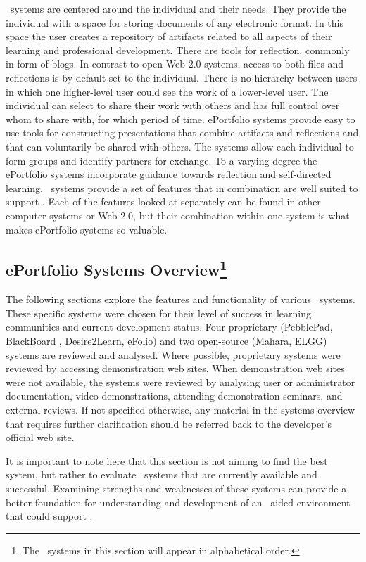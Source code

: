 \ep~systems are centered around the individual and their needs. They provide the
individual with a space for storing documents of any electronic format. In this
space the user creates a repository of artifacts related to all aspects of their
learning and professional development. There are tools for reflection, commonly
in form of blogs. In contrast to open Web 2.0 systems, access to both files and
reflections is by default set to the individual. There is no hierarchy between
users in which one higher-level user could see the work of a lower-level user.
The individual can select to share their work with others and has full control
over whom to share with, for which period of time. ePortfolio systems provide
easy to use tools for constructing presentations that combine artifacts and
reflections and that can voluntarily be shared with others. The systems allow
each individual to form groups and identify partners for exchange. To a varying
degree the ePortfolio systems incorporate guidance towards reflection and
self-directed learning. \ep~systems provide a set of features that in
combination are well suited to support \LLLsn. Each of the features looked at
separately can be found in other computer systems or Web 2.0, but their
combination within one system is what makes ePortfolio systems so valuable.

\subsection[ePortfolio Systems Overview]{ePortfolio Systems
Overview\footnote{The \ep~systems in this section will appear in alphabetical
order.}} 
The following sections explore the features and functionality of various
\ep~systems. These specific systems were chosen for their level of success in
learning communities and current development status. Four proprietary
(PebblePad, BlackBoard \ep, Desire2Learn, eFolio) and two open-source (Mahara,
ELGG) systems are reviewed and analysed. Where possible, proprietary systems
were reviewed by accessing demonstration web sites. When demonstration web
sites were not available, the systems were reviewed by analysing user or
administrator documentation, video demonstrations, attending demonstration
seminars, and external reviews. If not specified otherwise, any material in
the systems overview that requires further clarification should be referred back
to the developer's official web site.

It is important to note here that this section is not aiming to find the best
system, but rather to evaluate \ep~systems that are currently available and
successful. Examining strengths and weaknesses of these systems can provide a
better foundation for understanding and development of an \ep~aided environment
that could support \LLLsn.

